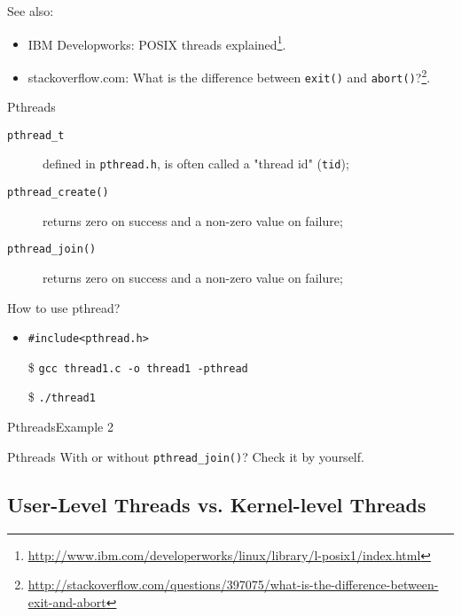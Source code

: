 See also:
\begin{itemize}
\item IBM Developworks: POSIX threads
  explained\footnote{\url{http://www.ibm.com/developerworks/linux/library/l-posix1/index.html}}.
\item stackoverflow.com: What is the difference between \texttt{exit()} and
  \texttt{abort()}?\footnote{\url{http://stackoverflow.com/questions/397075/what-is-the-difference-between-exit-and-abort}}.
\end{itemize}

\begin{frame}{Pthreads}
  \begin{description}
  \item[\texttt{pthread\_t}] defined in \texttt{pthread.h}, is often called a "thread id"
    (\texttt{tid});
  \item[\texttt{pthread\_create()}] returns zero on success and a non-zero value on failure;
  \item[\texttt{pthread\_join()}] returns zero on success and a non-zero value on failure;
  \end{description}
  \begin{block}{How to use pthread?}
    \begin{itemize}
    \item \texttt{\#include<pthread.h>}
    \item[\$] \texttt{gcc thread1.c -o thread1 -pthread}
    \item[\$] \texttt{./thread1}
    \end{itemize}
  \end{block}
\end{frame}

\begin{frame}{Pthreads}{Example 2}
  \begin{center}
  \end{center}
\end{frame}

\begin{frame}{Pthreads}
  With or without \texttt{pthread\_join()}? Check it by yourself.
\end{frame}

\subsection{User-Level Threads vs. Kernel-level Threads}
\label{sec:user-threads-vs}

